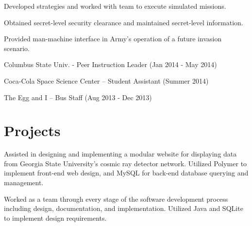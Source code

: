 \documentclass[]{deedy-resume-openfont}
\begin{document}
\begin{minipage}[t]{0.66\textwidth}
\begin{tightemize}
\item Developed strategies and worked with team to execute simulated missions.
\item Obtained secret-level security clearance and maintained secret-level information.
\item Provided man-machine interface in Army’s operation of a future invasion scenario.
\end{tightemize}
\sectionsep

\begin{tightemize}
\item Columbus State Univ. - Peer Instruction Leader (Jan 2014 - May 2014)
\item Coca-Cola Space Science Center – Student Assistant  (Summer 2014)
\item The Egg and I – Bus Staff  (Aug 2013 - Dec 2013)
\end{tightemize}
\sectionsep


\section{Projects}
Assisted in designing and implementing a modular website for displaying data from Georgia State University's cosmic ray detector network. Utilized Polymer to implement front-end web design, and MySQL for back-end database querying and management.
\sectionsep

Worked as a team through every stage of the software development process including design, documentation, and implementation. Utilized Java and SQLite to implement design requirements.
\sectionsep

\end{minipage} 
\end{document}
